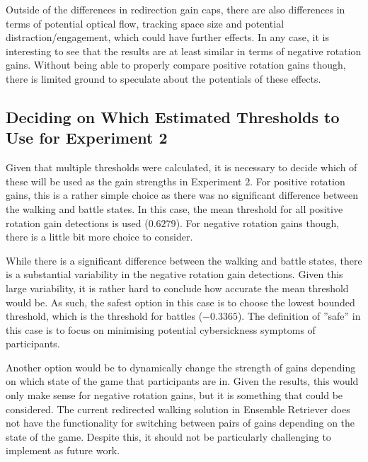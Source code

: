 Outside of the differences in redirection gain caps, there are also differences in terms of potential optical flow, tracking space size and potential distraction/engagement, which could have further effects. In any case, it is interesting to see that the results are at least similar in terms of negative rotation gains. Without being able to properly compare positive rotation gains though, there is limited ground to speculate about the potentials of these effects. 

\subsection{Deciding on Which Estimated Thresholds to Use for Experiment 2}
Given that multiple thresholds were calculated, it is necessary to decide which of these will be used as the gain strengths in Experiment 2. For positive rotation gains, this is a rather simple choice as there was no significant difference between the walking and battle states. In this case, the mean threshold for all positive rotation gain detections is used ($0.6279$). For negative rotation gains though, there is a little bit more choice to consider.

While there is a significant difference between the walking and battle states, there is a substantial variability in the negative rotation gain detections. Given this large variability, it is rather hard to conclude how accurate the mean threshold would be. As such, the safest option in this case is to choose the lowest bounded threshold, which is the threshold for battles ($-0.3365$). The definition of ''safe'' in this case is to focus on minimising potential cybersickness symptoms of participants. 

Another option would be to dynamically change the strength of gains depending on which state of the game that participants are in. Given the results, this would only make sense for negative rotation gains, but it is something that could be considered. The current redirected walking solution in Ensemble Retriever does not have the functionality for switching between pairs of gains depending on the state of the game. Despite this, it should not be particularly challenging to implement as future work.

